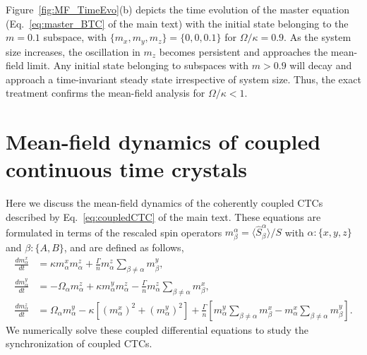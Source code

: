 \documentclass[pra,aps,twocolumn,superscriptaddress,notitlepage]{revtex4-1}
\begin{document}
	Figure~\ref{fig:MF_TimeEvo}(b) depicts the time evolution of the master equation (Eq.~\eqref{eq:master_BTC} of the main text) with the initial state belonging to the $m=0.1$ subspace, with $\{m_x,m_y,m_z\}=\{0,0,0.1\}$ for $\Omega/\kappa=0.9$. As the system size increases, the oscillation in $m_z$ becomes persistent and approaches the mean-field limit. Any initial state belonging to subspaces with $m>0.9$ will decay and approach a time-invariant steady state irrespective of system size.
	Thus, the exact treatment confirms the mean-field analysis for $\Omega/\kappa<1$. 
	
	\section{Mean-field dynamics of coupled continuous time crystals}
	Here we discuss the mean-field dynamics of the coherently coupled CTCs described by Eq.~\eqref{eq:coupledCTC} of the main text. These equations are formulated in terms of the rescaled spin operators $m^{\alpha}_{\beta} =\langle \hat{S}^{\alpha}_{\beta} \rangle/S$ with $\alpha: \{x,y,z\}$ and $\beta: \{A,B\}$, and are defined as follows, 
	\begin{align}
	\frac{dm^x_{\alpha}}{dt} & = \kappa m^x_{\alpha} m^z_{\alpha} + \frac{\Gamma}{n} m^z_{\alpha} \sum_{\beta\neq\alpha} m^y_{\beta}, \nonumber\\
	\frac{dm^y_{\alpha}}{dt} & = -\Omega_{\alpha} m^z_{\alpha} + \kappa m^y_{\alpha} m^z_{\alpha} - \frac{\Gamma}{n} m^z_{\alpha} \sum_{\beta\neq\alpha} m^x_{\beta},\label{eq:coupledMF} \\
	\frac{dm^z_{\alpha}}{dt} & = \Omega_{\alpha} m^y_{\alpha} - \kappa \left[( m^x_{\alpha})^2 + (m^y_{\alpha})^2 \right] + \frac{\Gamma}{n} \left[ m^y_{\alpha} \sum_{\beta\neq\alpha} m^x_{\beta} - m^x_{\alpha} \sum_{\beta\neq\alpha} m^y_{\beta} \right]. \nonumber
	\label{eq:MF}
	\end{align}
	We numerically solve these coupled differential equations to study the synchronization of coupled CTCs.
	
	
\end{document}
